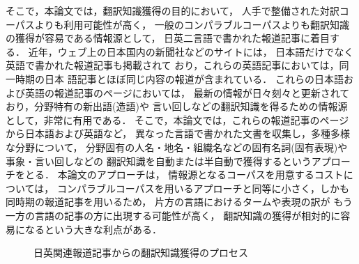 そこで，本論文では，翻訳知識獲得の目的において，
人手で整備された対訳コーパスよりも利用可能性が高く，
一般のコンパラブルコーパスよりも翻訳知識の獲得が容易である情報源として，
日英二言語で書かれた報道記事に着目する．
近年，ウェブ上の日本国内の新聞社などのサイトには，
日本語だけでなく英語で書かれた報道記事も掲載されて
おり，これらの英語記事においては，同一時期の日本
語記事とほぼ同じ内容の報道が含まれている．
これらの日本語および英語の報道記事のページにおいては，
最新の情報が日々刻々と更新されており，分野特有の新出語(造語)や
言い回しなどの翻訳知識を得るための情報源として，非常に有用である．
そこで，本論文では，これらの報道記事のページから日本語および英語など，
異なった言語で書かれた文書を収集し，多種多様な分野について，
分野固有の人名・地名・組織名などの固有名詞(固有表現)や事象・言い回しなどの
翻訳知識を自動または半自動で獲得するというアプローチをとる．
本論文のアプローチは，
情報源となるコーパスを用意するコストについては，
コンパラブルコーパスを用いるアプローチと同等に小さく，しかも
同時期の報道記事を用いるため，
片方の言語におけるタームや表現の訳が
もう一方の言語の記事の方に出現する可能性が高く，
翻訳知識の獲得が相対的に容易になるという大きな利点がある．

\begin{figure}
\begin{center}
\end{center}
\vspace*{-.0cm}
\caption{日英関連報道記事からの翻訳知識獲得のプロセス}
\label{fig:pic01}
\end{figure}

